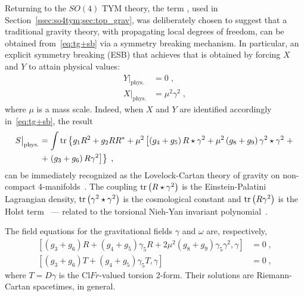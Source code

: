 \documentclass[../main.tex]{subfiles}
\begin{document}
Returning to the $SO(4)$ TYM theory, the term , used in Section~\ref{ssec:so4tym;sec:top_grav}, was deliberately chosen to suggest that a traditional gravity theory, with propagating local degrees of freedom, can be obtained from~\eqref{eq:tg+sb} via a symmetry breaking mechanism. In particular, an explicit symmetry breaking (ESB) that achieves that is obtained by forcing $X$ and $Y$ to attain physical values:
\begin{subequations}%
  \label{eq:physicalxy}
  \begin{align}
    Y\big|_{\text{phys.}} & = 0 \;, \label{eq:physicalsource1}              \\
    X\big|_{\text{phys.}} & = \mu^2 \gamma^2 \;, \label{eq:physicalsource2}
  \end{align}
\end{subequations}
where $\mu$ is a mass scale. Indeed, when $X$ and $Y$ are identified accordingly in~\eqref{eq:tg+sb}, the result
\begin{align}
  \label{eq:llc_action}
  S\big|_{\text{phys.}} & = \int \operatorname{tr} \left\{ g_1 R^2 + g_2 R R^* + \mu^2 \left[ \left( g_4 + g_5 \right) R \star \gamma^2 + \mu^2 \left( g_8 + g_9 \right) \gamma^2 \star \gamma^2  \right. + \right. \nonumber \\
                        & \left. + \left. \left( g_3 + g_6 \right) R \gamma^2 \right] \right\} \;,
\end{align}
can be immediately recognized as the Lovelock-Cartan theory of gravity on non-compact 4-manifolds~\cite{mardones1991a,hassaine2016a,corichi2016a}. The coupling $\operatorname{tr} \left( R \star \gamma^2 \right)$ is the Einstein-Palatini Lagrangian density, $\operatorname{tr} \left( \gamma^2 \star \gamma^2 \right)$ is the cosmological constant and $\operatorname{tr} \left( R \gamma^2 \right)$ is the Holst term~\cite{holst1996a} --- related to the torsional Nieh-Yan invariant polynomial~\cite{nieh1982a,chandia1997a,nieh2007a}.

The field equations for the gravitational fields $\gamma$ and $\omega$ are, respectively,
\begin{subequations}%
  \label{eq:grav_field_eqs}
  \begin{align}
    \left[ \left( g_3 + g_6 \right) R + \left( g_4 + g_5 \right) \gamma_5 R + 2 \mu^2 \left( g_8 + g_9 \right) \gamma_5\gamma^2 , \gamma \right] & = 0 \;, \\
    \left[ \left( g_3 + g_6 \right) T + \left( g_4 + g_5 \right) \gamma_5 T, \gamma \right]                                                      & = 0 \;,
  \end{align}
\end{subequations}
where $ T = D \gamma $ is the $\mathrm{Cl}Fr$-valued torsion 2-form. Their solutions are Riemann-Cartan spacetimes, in general.
\end{document}
